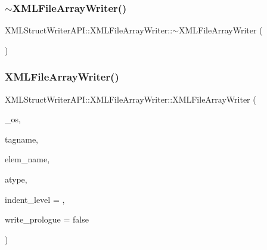 \subsubsection{\texorpdfstring{$\sim$XMLFileArrayWriter()}{~XMLFileArrayWriter()}\hspace{0.1cm}{\footnotesize\ttfamily [1/2]}}
{\footnotesize\ttfamily X\+M\+L\+Struct\+Writer\+A\+P\+I\+::\+X\+M\+L\+File\+Array\+Writer\+::$\sim$\+X\+M\+L\+File\+Array\+Writer (\begin{DoxyParamCaption}\item[{void}]{ }\end{DoxyParamCaption})\hspace{0.3cm}{\ttfamily [inline]}}

\mbox{\label{classXMLStructWriterAPI_1_1XMLFileArrayWriter_ab4591c76da7c7db03abe6a3e4cf0529a}} 
\subsubsection{\texorpdfstring{XMLFileArrayWriter()}{XMLFileArrayWriter()}\hspace{0.1cm}{\footnotesize\ttfamily [2/2]}}
{\footnotesize\ttfamily X\+M\+L\+Struct\+Writer\+A\+P\+I\+::\+X\+M\+L\+File\+Array\+Writer\+::\+X\+M\+L\+File\+Array\+Writer (\begin{DoxyParamCaption}\item[{std\+::ofstream \&}]{\+\_\+os,  }\item[{const std\+::string \&}]{tagname,  }\item[{const std\+::string \&}]{elem\+\_\+name,  }\item[{\mbox{\hyperlink{namespaceXMLStructWriterAPI_a2017208be87c77a32bdc19ea2f14d032}{Array\+Type}}}]{atype,  }\item[{int}]{indent\+\_\+level = {},  }\item[{bool}]{write\+\_\+prologue = {\ttfamily false} }\end{DoxyParamCaption})\hspace{0.3cm}{\ttfamily [inline]}}

